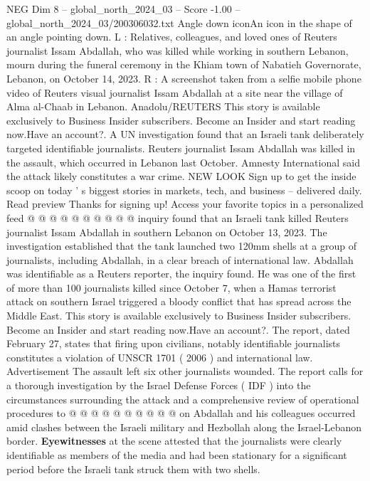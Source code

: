 \begin{textsample}{NEG Dim 8 – global\_north\_2024\_03 – Score -1.00 – global\_north\_2024\_03/200306032.txt}  \label{ex:f8_neg_443}
Angle down iconAn icon in the shape of an angle pointing down.
L : Relatives, colleagues, and loved ones of Reuters journalist Issam Abdallah, who was killed while working in southern Lebanon, mourn during the funeral ceremony in the Khiam town of Nabatieh Governorate, Lebanon, on October 14, 2023.
R : A screenshot taken from a selfie mobile phone video of Reuters visual journalist Issam Abdallah at a site near the village of Alma al-Chaab in Lebanon.
Anadolu/REUTERS This story is available exclusively to Business Insider subscribers.
Become an Insider and start reading now.Have an account?.
A UN investigation found that an Israeli tank deliberately targeted identifiable journalists.
Reuters journalist Issam Abdallah was killed in the assault, which occurred in Lebanon last October.
Amnesty International said the attack likely constitutes a war crime.
NEW LOOK Sign up to get the inside scoop on today ' s biggest stories in markets, tech, and business -- delivered daily.
Read preview Thanks for signing up!
Access your favorite topics in a personalized feed @ @ @ @ @ @ @ @ @ @ inquiry found that an Israeli tank killed Reuters journalist Issam Abdallah in southern Lebanon on October 13, 2023.
The investigation established that the tank launched two 120mm shells at a group of journalists, including Abdallah, in a clear breach of international law.
Abdallah was identifiable as a Reuters reporter, the inquiry found.
He was one of the first of more than 100 journalists killed since October 7, when a Hamas terrorist attack on southern Israel triggered a bloody conflict that has spread across the Middle East.
This story is available exclusively to Business Insider subscribers.
Become an Insider and start reading now.Have an account?.
The report, dated February 27, states that firing upon civilians, notably identifiable journalists constitutes a violation of UNSCR 1701 ( 2006 ) and international law.
Advertisement The assault left six other journalists wounded.
The report calls for a thorough investigation by the Israel Defense Forces ( IDF ) into the circumstances surrounding the attack and a comprehensive review of operational procedures to @ @ @ @ @ @ @ @ @ @ on Abdallah and his colleagues occurred amid clashes between the Israeli military and Hezbollah along the Israel-Lebanon border. \textbf{Eyewitnesses} at the scene attested that the journalists were clearly identifiable as members of the media and had been stationary for a significant period before the Israeli tank struck them with two shells.

\end{textsample}
